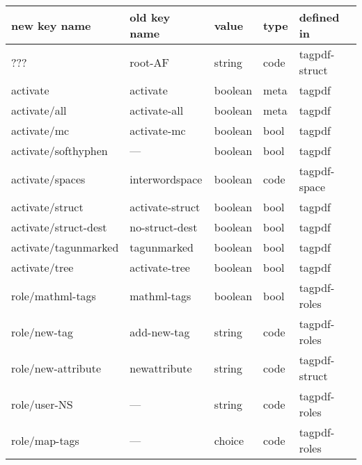\begin{tabular}{lllll}
\toprule
new key name    & old key name & value            &type   & defined in \\\midrule
 ???            & root-AF      & string           &code   &tagpdf-struct\\[4pt]\midrule

activate        & activate        & boolean         &meta  & tagpdf \\
activate/all    & activate-all    & boolean         &meta & tagpdf\\
activate/mc     & activate-mc     & boolean         &bool  & tagpdf\\
activate/softhyphen & ---         & boolean         &bool  & tagpdf \\    
activate/spaces & interwordspace  & boolean         &code  & tagpdf-space\\
activate/struct & activate-struct & boolean         &bool  & tagpdf\\  
activate/struct-dest & no-struct-dest&boolean       &bool  & tagpdf\\
activate/tagunmarked& tagunmarked & boolean         &bool & tagpdf\\
activate/tree   & activate-tree   & boolean         &bool  & tagpdf\\[4pt]\midrule  
role/mathml-tags & mathml-tags    & boolean          &bool  & tagpdf-roles\\
role/new-tag     & add-new-tag    & string           &code  & tagpdf-roles\\
role/new-attribute&newattribute   & string           &code  & tagpdf-struct\\
role/user-NS     & ---            & string           &code  & tagpdf-roles\\ 
role/map-tags      & ---            & choice           & code & tagpdf-roles\\[4pt]\midrule

\end{tabular}
